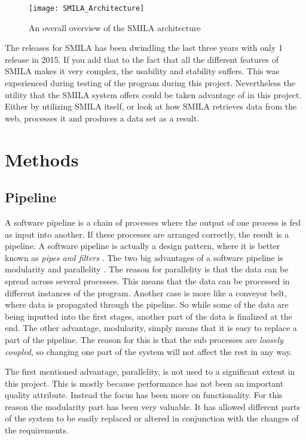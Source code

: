 \begin{figure}[h]
\caption{An overall overview of the SMILA architecture}
\texttt{[image: SMILA\_Architecture]}
\end{figure}

The releases for SMILA has been dwindling the last three years with only 1 release in 2015. If you add that to the fact that all the different features of SMILA makes it very complex, the usability and stability suffers. This was experienced during testing of the program during this project.
Nevertheless the utility that the SMILA system offers could be taken advantage of in this project. Either by utilizing SMILA itself, or look at how SMILA retrieves data from the web, processes it and produces a data set as a result.


\section{Methods} \label{2:m}

\subsection{Pipeline} \label{pipeline}

A software pipeline is a chain of processes where the output of one process is fed as input into another. If these processes are arranged correctly, the result is a pipeline. A software pipeline is actually a design pattern, where it is better known as \textit{pipes and filters} \cite{pipes-and-filters}. The two big advantages of a software pipeline is modularity and parallelity \cite{dart}. The reason for parallelity is that the data can be spread across several processes. This means that the data can be processed in different instances of the program. Another case is more like a conveyor belt, where data is propagated through the pipeline. So while some of the data are being inputted into the first stages, another part of the data is finalized at the end. The other advantage, modularity, simply means that it is easy to replace a part of the pipeline. The reason for this is that the sub processes are \textit{loosely coupled}, so changing one part of the system will not affect the rest in any way.

The first mentioned advantage, parallelity, is not used to a significant extent in this project. This is mostly because performance has not been an important quality attribute. Instead the focus has been more on functionality. For this reason the modularity part has been very valuable. It has allowed different parts of the system to be easily replaced or altered in conjunction with the changes of the requirements.


